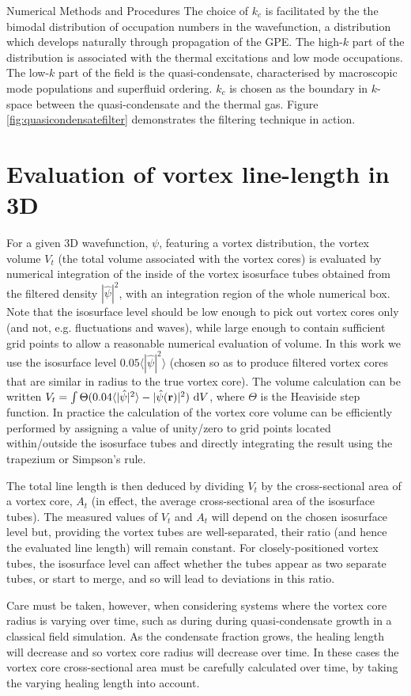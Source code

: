 \begin{chapter}{\label{cha:numerics}Numerical Methods and Procedures}
The choice of $k_c$ is facilitated by the the bimodal distribution of occupation numbers in the wavefunction, a distribution which develops naturally through propagation of the GPE. The high-$k$ part of the distribution is associated with the thermal excitations and low mode occupations. The low-$k$ part of the field is the quasi-condensate, characterised by macroscopic mode populations and superfluid ordering. $k_c$ is chosen as the boundary in $k$-space between the quasi-condensate and the thermal gas. Figure \ref{fig:quasicondensatefilter} demonstrates the filtering technique in action.

  	
\section{\label{section:linelength} Evaluation of vortex line-length in 3D}
For a given 3D wavefunction, $\psi$, featuring a vortex distribution, the vortex volume $V_t$ (the total volume associated with the vortex cores) is evaluated by numerical integration of the inside of the vortex isosurface tubes obtained from the filtered density $|\hat \psi|^2$, with an integration region of the whole numerical box.  Note that the isosurface level should be low enough to pick out vortex cores only (and not, e.g. fluctuations and waves), while large enough to contain sufficient grid points to allow a reasonable numerical evaluation of volume. In this work we use the isosurface level $0.05\langle |\hat{\psi}|^2 \rangle$ (chosen so as to produce filtered vortex cores that are similar in radius to the true vortex core).  The volume calculation can be written $V_t = \int \Theta(0.04\langle |\hat{\psi}|^2 \rangle - |\hat{\psi}({\bf r})|^2)~{\rm d}V$, where $\Theta$ is the Heaviside step function. In practice the calculation of the vortex core volume can be efficiently performed by assigning a value of unity/zero to grid points located within/outside the isosurface tubes and directly integrating the result using the trapezium or Simpson's rule.

The total line length is then deduced by dividing $V_t$ by the cross-sectional area of a vortex core, $A_t$ (in effect, the average cross-sectional area of the isosurface tubes). The measured values of $V_t$ and $A_t$ will depend on the chosen isosurface level but, providing the vortex tubes are well-separated, their ratio (and hence the evaluated line length) will remain constant.  For closely-positioned vortex tubes, the isosurface level can affect whether the tubes appear as two separate tubes, or start to merge, and so will lead to deviations in this ratio.

Care must be taken, however, when considering systems where the vortex core radius is varying over time, such as during during quasi-condensate growth in a classical field simulation. As the condensate fraction grows, the healing length will decrease and so vortex core radius will decrease over time. In these cases the vortex core cross-sectional area must be carefully calculated over time, by taking the varying healing length into account.
\end{chapter}
